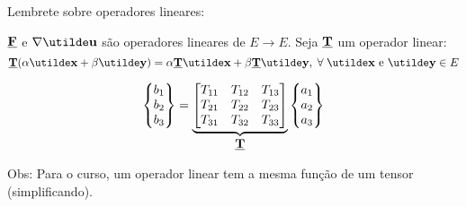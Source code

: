 Lembrete sobre operadores lineares:

$\underline{\mathbf{F}}$ e $\nabla\vt{u}$  são operadores lineares de $E\rightarrow E$. Seja $\underline{\mathbf{T}}$ um operador linear:
\[\ts{T}(\alpha\vt{x}+\beta\vt{y})=\alpha\ts{T}\vt{x}+\beta\ts{T}\vt{y},\;\forall\;\vt{x}\text{ e }\vt{y}\in\text{$E$}\]

\begin{figure}[H]
	\centering
	
\end{figure}

\[
	\begin{Bmatrix}
		b_1 \\ b_2 \\ b_3
	\end{Bmatrix}
	=
	\underbrace{
	\begin{bmatrix}
		T_{11} & T_{12} & T_{13} \\
		T_{21} & T_{22} & T_{23} \\
		T_{31} & T_{32} & T_{33}
	\end{bmatrix}
	}_{\displaystyle\underline{\mathbf{T}}}
	\begin{Bmatrix}
		a_1 \\ a_2 \\ a_3
	\end{Bmatrix}
\]

Obs: Para o curso, um operador linear tem a mesma função de um tensor (simplificando).